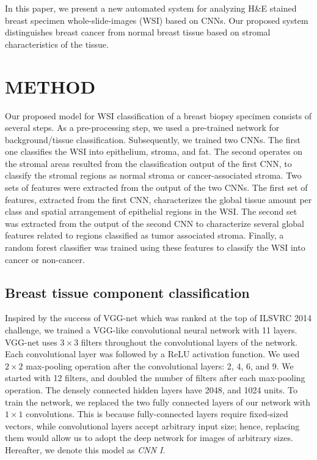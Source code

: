 \documentclass{article}
\begin{document}
In this paper, we present a new automated system for analyzing H\&E stained breast specimen whole-slide-images (WSI) based on CNNs. Our proposed system distinguishes breast cancer from normal breast tissue based on stromal characteristics of the tissue.
\vspace*{-5 pt}
\section{METHOD}
\label{sec:Method}
\vspace*{-5 pt}
Our proposed model for WSI classification of a breast biopsy specimen consists of several steps. As a pre-processing step, we used a pre-trained network for background/tissue classification. Subsequently, we trained two CNNs. The first one classifies the WSI into epithelium, stroma, and fat. The second operates on the stromal areas resulted from the classification output of the first CNN, to classify the stromal regions as normal stroma or cancer-associated stroma. Two sets of features were extracted from the output of the two CNNs. The first set of features, extracted from the first CNN, characterizes the global tissue amount per class and spatial arrangement of epithelial regions in the WSI. The second set was extracted from the output of the second CNN to characterize several global features related to regions classified as tumor associated stroma. Finally, a random forest classifier was trained using these features to classify the WSI into cancer or non-cancer.
\vspace*{-5 pt}
\subsection{Breast tissue component classification}
Inspired by the success of VGG-net \cite{simonyan2014} which was ranked at the top of ILSVRC 2014 challenge, we trained a VGG-like convolutional neural network with 11 layers. VGG-net uses $3 \times 3$ filters throughout the convolutional layers of the network. Each convolutional layer was followed by a ReLU activation function. We used $2 \times 2$ max-pooling operation after the convolutional layers: 2, 4, 6, and 9. We started with 12 filters, and doubled the number of filters after each max-pooling operation. The densely connected hidden layers have 2048, and 1024 units. To train the network, we replaced the two fully connected layers of our network with $1 \times 1$ convolutions. This is because fully-connected layers require fixed-sized vectors, while convolutional layers accept arbitrary input size; hence, replacing them would allow us to adopt the deep network for images of arbitrary sizes. Hereafter, we denote this model as \textit{CNN I}.
\vspace*{-5 pt}
\end{document}
